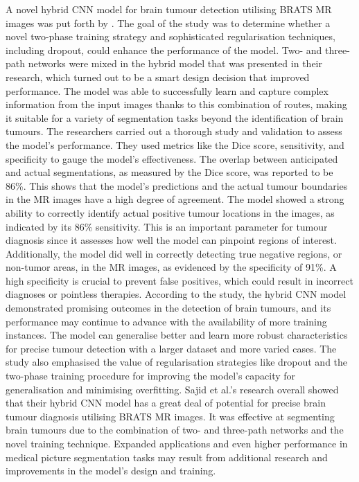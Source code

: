 \documentclass[12pt, a4paper,twoside]{report}
\theoremstyle{plain} %
\theoremstyle{definition} %
\theoremstyle{remark} %
\numberwithin{equation}{chapter}
\begin{document}
A novel hybrid CNN model for brain tumour detection utilising BRATS MR images was put forth by \cite{sajid19}. The goal of the study was to determine whether a novel two-phase training strategy and sophisticated regularisation techniques, including dropout, could enhance the performance of the model. Two- and three-path networks were mixed in the hybrid model that was presented in their research, which turned out to be a smart design decision that improved performance. The model was able to successfully learn and capture complex information from the input images thanks to this combination of routes, making it suitable for a variety of segmentation tasks beyond the identification of brain tumours. The researchers carried out a thorough study and validation to assess the model's performance. They used metrics like the Dice score, sensitivity, and specificity to gauge the model's effectiveness. The overlap between anticipated and actual segmentations, as measured by the Dice score, was reported to be 86\%. This shows that the model's predictions and the actual tumour boundaries in the MR images have a high degree of agreement. The model showed a strong ability to correctly identify actual positive tumour locations in the images, as indicated by its 86\% sensitivity. This is an important parameter for tumour diagnosis since it assesses how well the model can pinpoint regions of interest. Additionally, the model did well in correctly detecting true negative regions, or non-tumor areas, in the MR images, as evidenced by the specificity of 91\%. A high specificity is crucial to prevent false positives, which could result in incorrect diagnoses or pointless therapies. According to the study, the hybrid CNN model demonstrated promising outcomes in the detection of brain tumours, and its performance may continue to advance with the availability of more training instances. The model can generalise better and learn more robust characteristics for precise tumour detection with a larger dataset and more varied cases. The study also emphasised the value of regularisation strategies like dropout and the two-phase training procedure for improving the model's capacity for generalisation and minimising overfitting. Sajid et al.'s research overall showed that their hybrid CNN model has a great deal of potential for precise brain tumour diagnosis utilising BRATS MR images. It was effective at segmenting brain tumours due to the combination of two- and three-path networks and the novel training technique. Expanded applications and even higher performance in medical picture segmentation tasks may result from additional research and improvements in the model's design and training.
\end{document}
